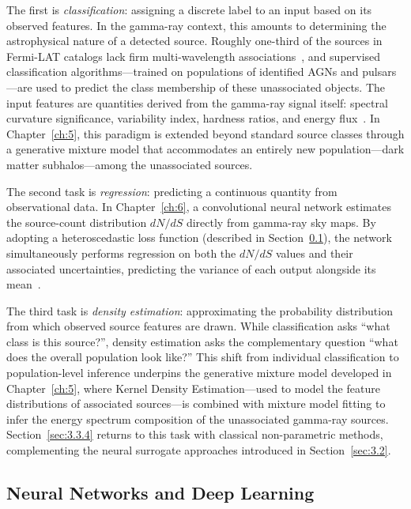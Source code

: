 The first is \textit{classification}: assigning a discrete label to an input based on its observed features.
In the gamma-ray context, this amounts to determining the astrophysical nature of a detected source.
Roughly one-third of the sources in Fermi-LAT catalogs lack firm multi-wavelength associations~\cite{Bhat:2022}, and supervised classification algorithms---trained on populations of identified AGNs and pulsars---are used to predict the class membership of these unassociated objects.
The input features are quantities derived from the gamma-ray signal itself: spectral curvature significance, variability index, hardness ratios, and energy flux~\cite{Bhat:2022}.
In Chapter~\ref{ch:5}, this paradigm is extended beyond standard source classes through a generative mixture model that accommodates an entirely new population---dark matter subhalos---among the unassociated sources.

The second task is \textit{regression}: predicting a continuous quantity from observational data.
In Chapter~\ref{ch:6}, a convolutional neural network estimates the source-count distribution $dN/dS$ directly from gamma-ray sky maps.
By adopting a heteroscedastic loss function (described in Section~\ref{sec:3.3.2}), the network simultaneously performs regression on both the $dN/dS$ values and their associated uncertainties, predicting the variance of each output alongside its mean~\cite{heteroscedastic-error}.

The third task is \textit{density estimation}: approximating the probability distribution from which observed source features are drawn.
While classification asks ``what class is this source?'', density estimation asks the complementary question ``what does the overall population look like?''
This shift from individual classification to population-level inference underpins the generative mixture model developed in Chapter~\ref{ch:5}, where Kernel Density Estimation---used to model the feature distributions of associated sources---is combined with mixture model fitting to infer the energy spectrum composition of the unassociated gamma-ray sources.
Section~\ref{sec:3.3.4} returns to this task with classical non-parametric methods, complementing the neural surrogate approaches introduced in Section~\ref{sec:3.2}.

\subsection{Neural Networks and Deep Learning}
\label{sec:3.3.2}

